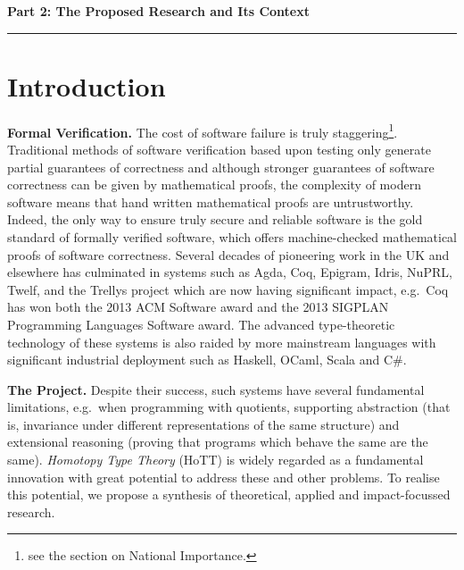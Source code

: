 \documentclass[a4paper,11pt]{article}
\newcommand{\eg}{{e.g.}\ }
\begin{document}
\newpage
\noindent
{\bf \Large Part 2: The Proposed Research and Its Context}

\vspace*{-0.23in}

\begin{center}
\rule{170mm}{.5mm}
\end{center}

\vspace*{-0.4in}

\section{Introduction}\label{sec:intro}

\vspace*{-0.1in}

{\bf Formal Verification.} The cost of software failure is truly
staggering\footnote{see the section on National
  Importance.}. Traditional methods of software verification based
upon testing only generate partial guarantees of correctness and
although stronger
guarantees of software correctness can be given by mathematical
proofs, the complexity of modern software means that hand written
mathematical proofs are untrustworthy. Indeed, the only way to
ensure truly secure and reliable software is the gold standard of
formally verified software, which offers machine-checked mathematical
proofs of software correctness. Several decades of pioneering work in
the UK and elsewhere has culminated in systems 
such as Agda, Coq, Epigram, Idris, NuPRL, Twelf, and
the Trellys project which are now having significant impact,
\eg Coq has won both the 2013 ACM Software award and the 2013 SIGPLAN
Programming Languages Software award. The advanced type-theoretic
technology of these systems is also raided by more mainstream languages
with significant industrial deployment such as Haskell, OCaml, Scala
and C\#.


{\bf The Project.} Despite their success, such systems have several
fundamental limitations, \eg when programming with quotients,
supporting abstraction (that is, invariance under different
representations of the same structure) and extensional reasoning
(proving that programs which behave the same are the same).  {\em
  Homotopy Type Theory} (HoTT) is widely regarded as a fundamental
innovation with great potential to address these and other problems.
To realise this potential, we propose a synthesis of
theoretical, applied and impact-focussed research.
\end{document}
